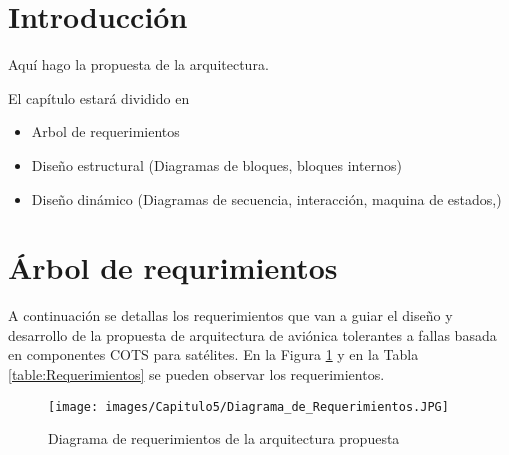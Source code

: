 \section{Introducción}
Aquí hago la propuesta de la arquitectura.

El capítulo estará dividido en

\begin{itemize}
\item Arbol de requerimientos
\item Diseño estructural (Diagramas de bloques, bloques internos)
\item Diseño dinámico (Diagramas de secuencia, interacción, maquina de estados,)
  
\end{itemize}

\section{Árbol de requrimientos}
A continuación se detallas los requerimientos que van a guiar el diseño y
desarrollo de la propuesta de arquitectura de aviónica tolerantes a fallas
basada en componentes \ac{COTS} para satélites. En la Figura
\ref{fig:DiagramaRequerimientos} y en la Tabla \ref{table:Requerimientos} se pueden
observar los requerimientos. 

\begin{figure}[h!]
 \centering
 \texttt{[image: images/Capitulo5/Diagrama\_de\_Requerimientos.JPG]}
  \caption{Diagrama de requerimientos de la arquitectura propuesta}
\label{fig:DiagramaRequerimientos}
\end{figure} 

